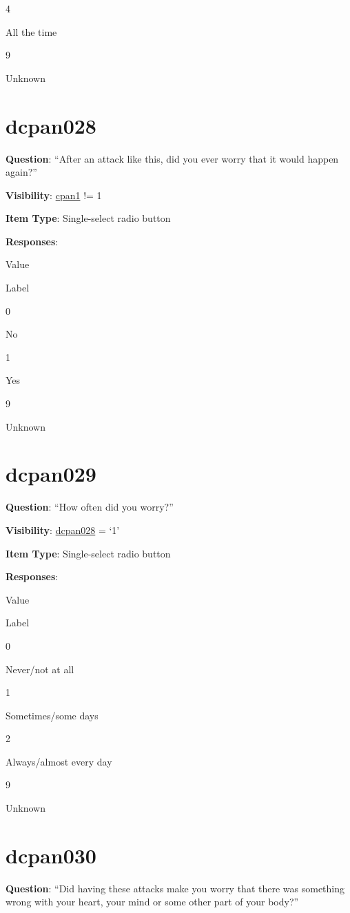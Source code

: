 \documentclass[]{book}
\begin{document}
4

All the time

9

Unknown

\hypertarget{dcpan028}{%
\section{dcpan028}\label{dcpan028}}

\textbf{Question}: ``After an attack like this, did you ever worry that it would happen again?''

\textbf{Visibility}: \protect\hyperlink{cpan1}{cpan1} != 1

\textbf{Item Type}: Single-select radio button

\textbf{Responses}:

Value

Label

0

No

1

Yes

9

Unknown

\hypertarget{dcpan029}{%
\section{dcpan029}\label{dcpan029}}

\textbf{Question}: ``How often did you worry?''

\textbf{Visibility}: \protect\hyperlink{dcpan028}{dcpan028} = `1'

\textbf{Item Type}: Single-select radio button

\textbf{Responses}:

Value

Label

0

Never/not at all

1

Sometimes/some days

2

Always/almost every day

9

Unknown

\hypertarget{dcpan030}{%
\section{dcpan030}\label{dcpan030}}

\textbf{Question}: ``Did having these attacks make you worry that there was something wrong with your heart, your mind or some other part of your body?''
\end{document}
